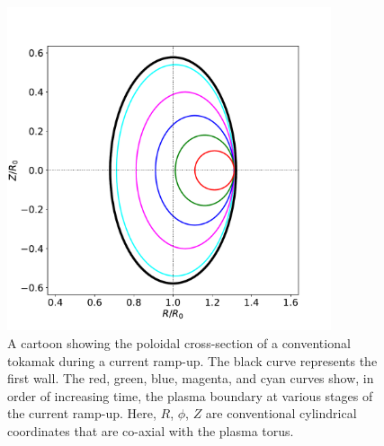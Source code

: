 \documentclass[12pt,prb,aps]{revtex4-1}
\begin{document}
\begin{figure}
\centerline{\includegraphics[width=0.85\textwidth]{Figure1.pdf}}
\caption{A cartoon showing the poloidal cross-section of a conventional tokamak during a current ramp-up. The black curve represents the first wall. The
red, green, blue, magenta, and cyan curves show, in order of increasing time, the plasma boundary at various stages of the current ramp-up.
Here, $R$, $\phi$, $Z$ are conventional cylindrical coordinates that are co-axial with the plasma torus. }\label{fig1}
\end{figure}
\end{document}
